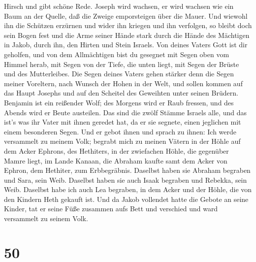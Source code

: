 Hirsch und gibt schöne Rede.  Joseph wird wachsen, er wird
wachsen wie ein Baum an der Quelle, daß die Zweige emporsteigen über die
Mauer.  Und wiewohl ihn die Schützen erzürnen und wider ihn
kriegen und ihn verfolgen,  so bleibt doch sein Bogen fest
und die Arme seiner Hände stark durch die Hände des Mächtigen in Jakob,
durch ihn, den Hirten und Stein Israels.  Von deines Vaters
Gott ist dir geholfen, und von dem Allmächtigen bist du gesegnet mit
Segen oben vom Himmel herab, mit Segen von der Tiefe, die unten liegt,
mit Segen der Brüste und des Mutterleibes.  Die Segen
deines Vaters gehen stärker denn die Segen meiner Voreltern, nach Wunsch
der Hohen in der Welt, und sollen kommen auf das Haupt Josephs und auf
den Scheitel des Geweihten unter seinen Brüdern.  Benjamin
ist ein reißender Wolf; des Morgens wird er Raub fressen, und des Abends
wird er Beute austeilen.  Das sind die zwölf Stämme Israels
alle, und das ist's was ihr Vater mit ihnen geredet hat, da er sie
segnete, einen jeglichen mit einem besonderen Segen.  Und
er gebot ihnen und sprach zu ihnen: Ich werde versammelt zu meinem Volk;
begrabt mich zu meinen Vätern in der Höhle auf dem Acker Ephrons, des
Hethiters,  in der zwiefachen Höhle, die gegenüber Mamre
liegt, im Lande Kanaan, die Abraham kaufte samt dem Acker von Ephron,
dem Hethiter, zum Erbbegräbnis.  Daselbst haben sie Abraham
begraben und Sara, sein Weib. Daselbst haben sie auch Isaak begraben und
Rebekka, sein Weib. Daselbst habe ich auch Lea begraben, 
in dem Acker und der Höhle, die von den Kindern Heth gekauft ist.
 Und da Jakob vollendet hatte die Gebote an seine Kinder,
tat er seine Füße zusammen aufs Bett und verschied und ward versammelt
zu seinem Volk.

\hypertarget{section-49}{%
\section{50}\label{section-49}}

